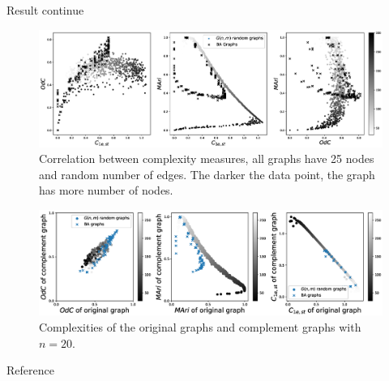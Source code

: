 \documentclass{beamer}
\begin{document}
    \begin{frame}{Result continue}
        \vspace{-5mm}
            \begin{figure}
                \includegraphics[width=\textwidth,height=0.5\textheight,keepaspectratio]{complexity_correlation.eps}
                \vspace{-10mm}
                \caption{Correlation between complexity measures, all graphs have 25 nodes and random number of edges. The darker the data point, the graph has more number of nodes.}
            \end{figure}
            \vspace{-15mm}
            \begin{figure}
                \includegraphics[width=\textwidth,height=0.5\textheight,keepaspectratio]{complement.eps}
                \caption{ Complexities of the original graphs and complement graphs with $n = 20$.}
            \end{figure}
    \end{frame}



    \begin{frame}{Reference}
    \end{frame}
\end{document}

